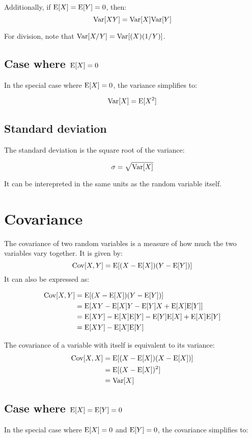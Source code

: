\documentclass[12pt]{article}
\begin{document}
Additionally, if $\mathrm{E}[X] = \mathrm{E}[Y] = 0$, then:
$$ \mathrm{Var}[X Y] = \mathrm{Var}[X] \mathrm{Var}[Y] $$

For division, note that $\mathrm{Var}[X / Y] = \mathrm{Var}[(X) (1 / Y)] $.

\subsection{\texorpdfstring{Case where $\mathrm{E}[X] = 0$}{Case where \E[X] = 0}}
In the special case where $\mathrm{E}[X] = 0$, the variance simplifies to:

$$ \mathrm{Var}[X] = \mathrm{E}[X^2] $$

\subsection{Standard deviation}

The standard deviation is the square root of the variance:

$$ \sigma = \sqrt{\mathrm{Var}[X]} $$

It can be interepreted in the same units as the random variable itself.

\section{Covariance}
The covariance of two random variables is a measure of how much the two variables vary together.
It is given by:
$$ \mathrm{Cov}[X,Y] = \mathrm{E}[(X - \mathrm{E}[X])(Y - \mathrm{E}[Y])] $$
It can also be expressed as:

\begin{align*}
    \mathrm{Cov}[X,Y] &= \mathrm{E}[(X - \mathrm{E}[X])(Y - \mathrm{E}[Y])] \\
    &= \mathrm{E}[XY - \mathrm{E}[X]Y - \mathrm{E}[Y]X + \mathrm{E}[X]\mathrm{E}[Y]] \\
    &= \mathrm{E}[XY] - \mathrm{E}[X]\mathrm{E}[Y] - \mathrm{E}[Y]\mathrm{E}[X] + \mathrm{E}[X]\mathrm{E}[Y] \\
    &= \mathrm{E}[XY] - \mathrm{E}[X]\mathrm{E}[Y]
\end{align*}

The covariance of a variable with itself is equivalent to its variance:
\begin{align*}
    \mathrm{Cov}[X,X] &= \mathrm{E}[(X - \mathrm{E}[X])(X - \mathrm{E}[X])] \\
    &= \mathrm{E}[(X - \mathrm{E}[X])^2] \\
    &= \mathrm{Var}[X]
\end{align*}

\subsection{\texorpdfstring{Case where $\mathrm{E}[X] = \mathrm{E}[Y] = 0$}{Case where \E[X] = \E[Y] = 0}}
In the special case where $\mathrm{E}[X] = 0$ and $\mathrm{E}[Y] = 0$, the covariance simplifies to:
\end{document}
